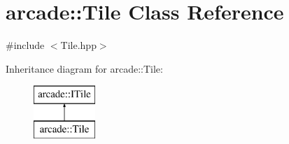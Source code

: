 \hypertarget{classarcade_1_1_tile}{}\section{arcade\+:\+:Tile Class Reference}
\label{classarcade_1_1_tile}


{\ttfamily \#include $<$Tile.\+hpp$>$}

Inheritance diagram for arcade\+:\+:Tile\+:\begin{figure}[H]
\begin{center}
\leavevmode
\includegraphics[height=2.000000cm]{classarcade_1_1_tile}
\end{center}
\end{figure}
